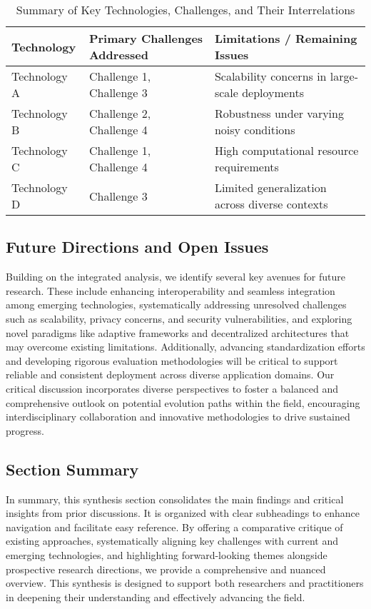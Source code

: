 \documentclass[sigconf]{acmart}
\begin{document}
\begin{table*}[htbp]
\centering
\caption{Summary of Key Technologies, Challenges, and Their Interrelations}
\label{tab:challenge_technology_summary}
\begin{adjustbox}{max width=\textwidth}
\begin{tabular}{@{}lll@{}}
\toprule
\textbf{Technology} & \textbf{Primary Challenges Addressed} & \textbf{Limitations / Remaining Issues} \\ \midrule
Technology A & Challenge 1, Challenge 3 & Scalability concerns in large-scale deployments \\
Technology B & Challenge 2, Challenge 4 & Robustness under varying noisy conditions \\
Technology C & Challenge 1, Challenge 4 & High computational resource requirements \\
Technology D & Challenge 3 & Limited generalization across diverse contexts \\ \bottomrule
\end{tabular}
\end{adjustbox}
\end{table*}

\subsection{Future Directions and Open Issues}
Building on the integrated analysis, we identify several key avenues for future research. These include enhancing interoperability and seamless integration among emerging technologies, systematically addressing unresolved challenges such as scalability, privacy concerns, and security vulnerabilities, and exploring novel paradigms like adaptive frameworks and decentralized architectures that may overcome existing limitations. Additionally, advancing standardization efforts and developing rigorous evaluation methodologies will be critical to support reliable and consistent deployment across diverse application domains. Our critical discussion incorporates diverse perspectives to foster a balanced and comprehensive outlook on potential evolution paths within the field, encouraging interdisciplinary collaboration and innovative methodologies to drive sustained progress.

\subsection{Section Summary}
In summary, this synthesis section consolidates the main findings and critical insights from prior discussions. It is organized with clear subheadings to enhance navigation and facilitate easy reference. By offering a comparative critique of existing approaches, systematically aligning key challenges with current and emerging technologies, and highlighting forward-looking themes alongside prospective research directions, we provide a comprehensive and nuanced overview. This synthesis is designed to support both researchers and practitioners in deepening their understanding and effectively advancing the field.
\end{document}

